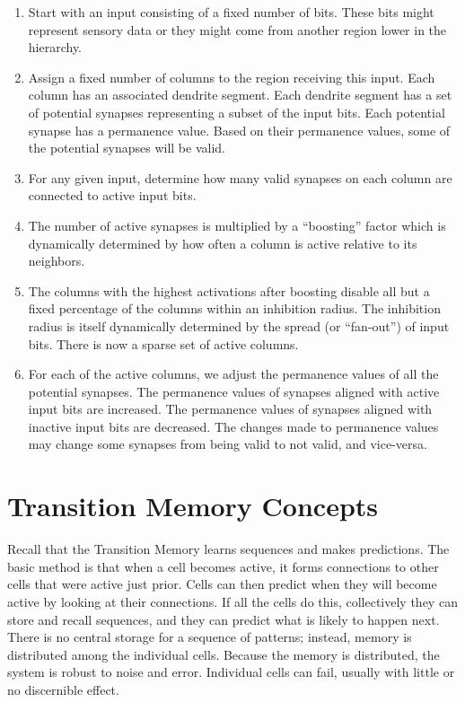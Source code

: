 \begin{enumerate}
\item Start with an input consisting of a fixed number of bits. These
  bits might represent sensory data or they might come from another
  region lower in the hierarchy.

\item Assign a fixed number of columns to the region receiving this
  input. Each column has an associated dendrite segment. Each dendrite
  segment has a set of potential synapses representing a subset of the
  input bits. Each potential synapse has a permanence value. Based on
  their permanence values, some of the potential synapses will be
  valid.

\item For any given input, determine how many valid synapses on each
  column are connected to active input bits.

\item The number of active synapses is multiplied by a ``boosting''
  factor which is dynamically determined by how often a column is
  active relative to its neighbors.

\item The columns with the highest activations after boosting disable
  all but a fixed percentage of the columns within an inhibition
  radius. The inhibition radius is itself dynamically determined by
  the spread (or ``fan-out'') of input bits. There is now a sparse set
  of active columns.

\item For each of the active columns, we adjust the permanence values
  of all the potential synapses. The permanence values of synapses
  aligned with active input bits are increased. The permanence values
  of synapses aligned with inactive input bits are decreased. The
  changes made to permanence values may change some synapses from
  being valid to not valid, and vice-versa.
\end{enumerate}

\section*{Transition Memory Concepts}

Recall that the Transition Memory learns sequences and makes
predictions. The basic method is that when a cell becomes active, it
forms connections to other cells that were active just prior. Cells
can then predict when they will become active by looking at their
connections. If all the cells do this, collectively they can store and
recall sequences, and they can predict what is likely to happen
next. There is no central storage for a sequence of patterns; instead,
memory is distributed among the individual cells. Because the memory
is distributed, the system is robust to noise and error. Individual
cells can fail, usually with little or no discernible effect.

